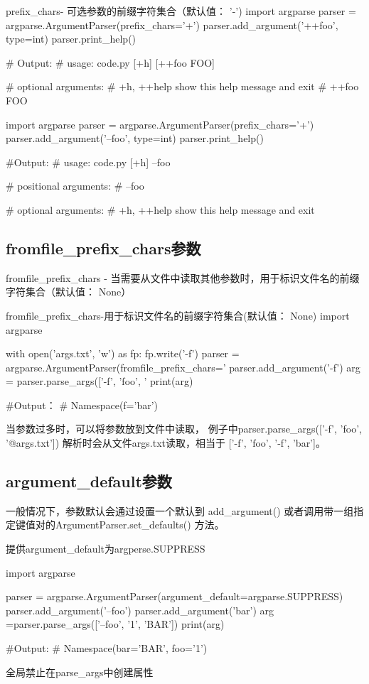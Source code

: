 \documentclass[11pt]{article}
\begin{document}
 	\begin{Python}{prefix\_chars- 可选参数的前缀字符集合（默认值： '-')}
import argparse
parser = argparse.ArgumentParser(prefix_chars='+')
parser.add_argument('++foo', type=int)
parser.print_help()

# Output:
#		 usage: code.py [+h] [++foo FOO]

#		 optional arguments:
#          +h, ++help  show this help message and exit
#          ++foo FOO

import argparse
parser = argparse.ArgumentParser(prefix_chars='+')
parser.add_argument('--foo', type=int)
parser.print_help()

#Output:
#		usage: code.py [+h] --foo

#		positional arguments:
#  		  --foo

#       optional arguments:
#         +h, ++help  show this help message and exit

 	\end{Python}
\subsection{fromfile\_prefix\_chars参数}
 fromfile\_prefix\_chars - 当需要从文件中读取其他参数时，用于标识文件名的前缀字符集合（默认值： None）
 \begin{Python}{fromfile\_prefix\_chars-用于标识文件名的前缀字符集合(默认值： None)}
import argparse

with open('args.txt', 'w') as fp:
fp.write('-f\nbar')
parser = argparse.ArgumentParser(fromfile_prefix_chars='%
parser.add_argument('-f')
arg = parser.parse_args(['-f', 'foo', '%
print(arg)

#Output：
#		Namespace(f='bar')

 \end{Python}
 
 当参数过多时，可以将参数放到文件中读取，
 例子中parser.parse\_args(['-f', 'foo', '@args.txt'])
 解析时会从文件args.txt读取，相当于 ['-f', 'foo', '-f', 'bar']。
 
\subsection{argument\_default参数}
 	一般情况下，参数默认会通过设置一个默认到 add\_argument() 或者调用带一组指定键值对的ArgumentParser.set\_defaults() 方法。
 	
 	\begin{Python}{提供argument\_default为argperse.SUPPRESS}
 		
import argparse

parser = argparse.ArgumentParser(argument_default=argparse.SUPPRESS)
parser.add_argument('--foo')
parser.add_argument('bar')
arg =parser.parse_args(['--foo', '1', 'BAR'])
print(arg)

#Output:
#		Namespace(bar='BAR', foo='1')

 	\end{Python}
 全局禁止在parse\_args中创建属性
\end{document}
